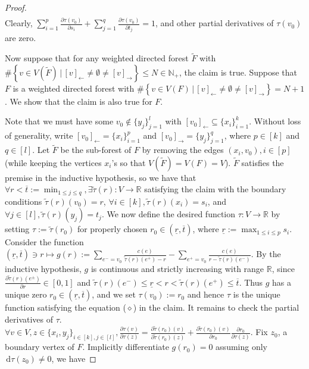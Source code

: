 \documentclass[fleqn]{article}
\theoremstyle{definition}
\theoremstyle{remark}
\renewcommand{\d}{\,\mathrm{d}} %
\begin{document}
\begin{proof}
\begin{align*}
\end{align*}
Clearly, $\sum_{i=1}^p \frac{\partial \tau(v_0)}{\partial s_i}+ \sum_{j=1}^q \frac{\partial \tau(v_0)}{\partial t_j}=1$, and other partial derivatives of $\tau(v_0)$ are zero.
\par
Now suppose that for any weighted directed forest $\tilde{F}$ with $\#\left\{v\in V(\tilde{F}) \,\big|\, [v]_\leftarrow \ne \emptyset \ne [v]_\rightarrow \right\} \le N\in\mathbb{N}_+$, the claim is true. Suppose that $F$ is a weighted directed forest with $\#\left\{v\in V(F) \,\big|\, [v]_\leftarrow \ne \emptyset \ne [v]_\rightarrow \right\} =N+1$. We show that the claim is also true for $F$.
\par
Note that we must have some $v_0\not\in\{y_j\}_{j=1}^l$ with $[v_0]_\leftarrow \subseteq \{x_i\}_{i=1}^k$.  Without loss of generality, write $[v_0]_\leftarrow=\{x_i\}_{i=1}^p$ and $[v_0]_\rightarrow=\{y_j\}_{j=1}^q$, where $p\in[k]$ and $q\in[l]$. Let $\tilde{F}$ be the sub-forest of $F$ by removing the edges $(x_i,v_0),i\in[p]$ (while keeping the vertices $x_i$'s so that $V(\tilde{F})=V(F)=V$). $\tilde{F}$ satisfies the premise in the inductive hypothesis, so we have that $\forall r <\overline{t}:=\min_{1\le j\le q}, \exists \tilde{\tau}(r):V \rightarrow \mathbb{R}$ satisfying the claim with the boundary conditions $\tilde{\tau}(r)(v_0)=r$, $\forall i\in[k], \tilde{\tau}(r)(x_i)=s_i$, and $\forall j\in[l], \tilde{\tau}(r)(y_j)=t_j$. We now define the desired function $\tau:V \rightarrow \mathbb{R}$ by setting $\tau:=\tilde{\tau}(r_0)$ for properly  chosen $r_0\in \left(\underline{r}, \overline{t}\right)$, where $\underline{r}:= \max_{1\le i\le p} s_i$. Consider the function $\left(\underline{r},\overline{t}\right) \ni r \mapsto g(r):=\sum_{e^- =v_0}\frac{c(e)}{\tilde{\tau}(r)(e^+)-r} - \sum_{e^+ =v_0}\frac{c(e)}{r-\tilde{\tau}(r)(e^-)}$. By the inductive hypothesis, $g$ is continuous and strictly increasing with range $\mathbb{R}$, since $\frac{\partial \tilde{\tau}(r)(e^\pm)}{\partial r}\in[0,1]$ and $\tilde{\tau}(r)(e^-) \le \underline{r} <r<\tilde{\tau}(r)(e^+) \le \overline{t}$. Thus $g$ has a unique zero $r_0\in(\underline{r},\overline{t})$, and we set $\tau(v_0):=r_0$ and hence $\tau$ is the unique function satisfying the equation ($\diamond$) in the claim. It remains to check the partial derivatives of $\tau$. $\forall v\in V, z\in \{x_i,y_j\}_{i\in[k],j\in[l]}, \frac{\partial \tau(v)}{\partial \tau(z)} = \frac{\partial \tilde{\tau}(r_0)(v)}{\partial \tilde{\tau}(r_0)(z)} + \frac{\partial \tilde{\tau}(r_0)(v)}{\partial r_0} \frac{\partial r_0}{\partial \tau(z)}$. Fix $z_0$, a boundary vertex of $F$. Implicitly differentiate $g(r_0)=0$ assuming only $\d\tau(z_0) \ne 0$, we have

\end{proof}
\end{document}
